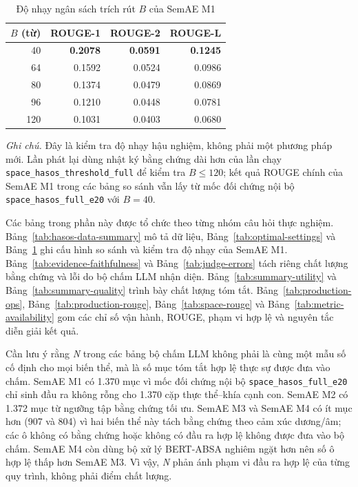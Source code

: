 \begin{table}[tbp]
\centering
\caption{Độ nhạy ngân sách trích rút $B$ của SemAE M1}
\label{tab:m1-token-sweep}
\small
\begin{tabular}{r r r r}
\toprule
\textbf{$B$ (từ)} & \textbf{ROUGE-1} & \textbf{ROUGE-2} & \textbf{ROUGE-L} \\
\midrule
40  & \textbf{\num{0.2078}} & \textbf{\num{0.0591}} & \textbf{\num{0.1245}} \\
64  & \num{0.1592} & \num{0.0524} & \num{0.0986} \\
80  & \num{0.1374} & \num{0.0479} & \num{0.0869} \\
96  & \num{0.1210} & \num{0.0448} & \num{0.0781} \\
120 & \num{0.1031} & \num{0.0403} & \num{0.0680} \\
\bottomrule
\end{tabular}

\vspace{0.35em}
\begin{minipage}{0.82\textwidth}
\footnotesize\RaggedRight
\textit{Ghi chú.} Đây là kiểm tra độ nhạy hậu nghiệm, không phải một phương pháp mới. Lần phát lại dùng nhật ký bằng chứng dài hơn của lần chạy \texttt{space\_hasos\_threshold\_full} để kiểm tra $B \leq 120$; kết quả ROUGE chính của SemAE M1 trong các bảng so sánh vẫn lấy từ mốc đối chứng nội bộ \texttt{space\_hasos\_full\_e20} với $B=40$.
\end{minipage}
\end{table}

Các bảng trong phần này được tổ chức theo từng nhóm câu hỏi thực nghiệm. Bảng~\ref{tab:hasos-data-summary} mô tả dữ liệu, Bảng~\ref{tab:optimal-settings} và Bảng~\ref{tab:m1-token-sweep} ghi cấu hình so sánh và kiểm tra độ nhạy của SemAE M1. Bảng~\ref{tab:evidence-faithfulness} và Bảng~\ref{tab:judge-errors} tách riêng chất lượng bằng chứng và lỗi do bộ chấm LLM nhận diện. Bảng~\ref{tab:summary-utility} và Bảng~\ref{tab:summary-quality} trình bày chất lượng tóm tắt. Bảng~\ref{tab:production-ops}, Bảng~\ref{tab:production-rouge}, Bảng~\ref{tab:space-rouge} và Bảng~\ref{tab:metric-availability} gom các chỉ số vận hành, ROUGE, phạm vi hợp lệ và nguyên tắc diễn giải kết quả.

Cần lưu ý rằng \textit{N} trong các bảng bộ chấm LLM không phải là cùng một mẫu số cố định cho mọi biến thể, mà là số mục tóm tắt hợp lệ thực sự được đưa vào chấm. SemAE M1 có 1.370 mục vì mốc đối chứng nội bộ \texttt{space\_hasos\_full\_e20} chỉ sinh đầu ra không rỗng cho 1.370 cặp thực thể--khía cạnh con. SemAE M2 có 1.372 mục từ ngưỡng tập bằng chứng tối ưu. SemAE M3 và SemAE M4 có ít mục hơn (907 và 804) vì hai biến thể này tách bằng chứng theo cảm xúc dương/âm; các ô không có bằng chứng hoặc không có đầu ra hợp lệ không được đưa vào bộ chấm. SemAE M4 còn dùng bộ xử lý BERT-ABSA nghiêm ngặt hơn nên số ô hợp lệ thấp hơn SemAE M3. Vì vậy, \textit{N} phản ánh phạm vi đầu ra hợp lệ của từng quy trình, không phải điểm chất lượng.

